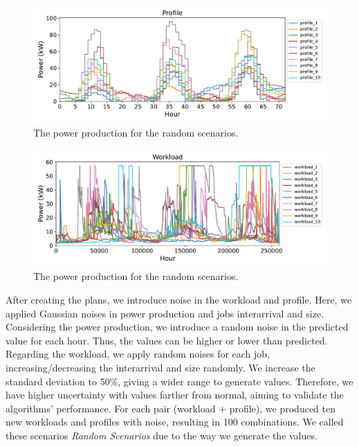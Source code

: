 \begin{figure}[!htb]
    \centering
    \includegraphics[scale=0.58]{Images/Compensations/diff_power_production.pdf}
    \caption{The power production for the random scenarios.}
    \label{fig:average_weather_with_noise}
\end{figure}

\begin{figure}[!htb]
    \centering
    \includegraphics[scale=0.58]{Images/Compensations/diff_jobs_arriving.pdf}
    \caption{The power production for the random scenarios.}
    \label{fig:average_workload_with_noise}
\end{figure}

After creating the plans, we introduce noise in the workload and profile. Here, we applied Gaussian noises in power production and jobs interarrival and size. Considering the power production, we introduce a random noise in the predicted value for each hour. Thus, the values can be higher or lower than predicted. Regarding the workload, we apply random noises for each job, increasing/decreasing the interarrival and size randomly. We increase the standard deviation to 50\%, giving a wider range to generate values. Therefore, we have higher uncertainty with values farther from normal, aiming to validate the algorithms' performance. For each pair (workload + profile), we produced ten new workloads and profiles with noise, resulting in 100 combinations. We called these scenarios \emph{Random Scenarios} due to the way we generate the values.

